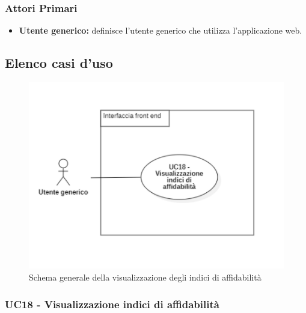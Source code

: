 \subsubsection{Attori Primari}\label{UFattoriPrimariFac}
\begin{itemize}
	\item \textbf{Utente generico:} definisce l'utente generico che utilizza l'applicazione web.
\end{itemize}

\subsection{Elenco casi d'uso}\label{CasiDUsoCasiDUsoFacoltativiTraUnUtenteEIlFrontEndElencoCasiDUso}



\begin{center}
	\begin{figure}[H]
		\centering\includegraphics[scale=0.7]{../immagini/attori_casi/UC_18.png}
		\caption{Schema generale della visualizzazione degli indici di affidabilità}
	\end{figure}
\end{center}


\subsubsection{UC18 - Visualizzazione indici di affidabilità}\label{CasiDUsoCasiDUsoFacoltativiTraUnUtenteEIlFrontEndElencoCasiDUsoUC10VisualizzazioneIndiciDiAffidabilita}



